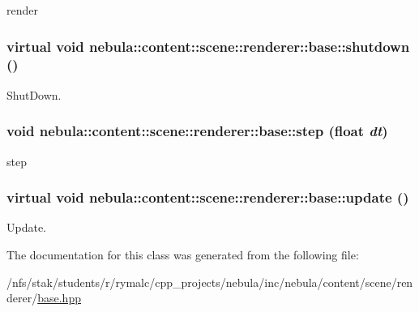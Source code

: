 render \hypertarget{classnebula_1_1content_1_1scene_1_1renderer_1_1base_a62a8f444cb75cfe6ce3d1f49ac37b7bf}{
\subsubsection[{shutdown}]{\setlength{\rightskip}{0pt plus 5cm}virtual void nebula::content::scene::renderer::base::shutdown ()}}
\label{classnebula_1_1content_1_1scene_1_1renderer_1_1base_a62a8f444cb75cfe6ce3d1f49ac37b7bf}


ShutDown. \hypertarget{classnebula_1_1content_1_1scene_1_1renderer_1_1base_ade885ed707f99d8ad18bbb78f6581f0d}{
\subsubsection[{step}]{\setlength{\rightskip}{0pt plus 5cm}void nebula::content::scene::renderer::base::step (float {\em dt})}}
\label{classnebula_1_1content_1_1scene_1_1renderer_1_1base_ade885ed707f99d8ad18bbb78f6581f0d}


step \hypertarget{classnebula_1_1content_1_1scene_1_1renderer_1_1base_abb85502bfd92c766f6ab75fb6582e30b}{
\subsubsection[{update}]{\setlength{\rightskip}{0pt plus 5cm}virtual void nebula::content::scene::renderer::base::update ()}}
\label{classnebula_1_1content_1_1scene_1_1renderer_1_1base_abb85502bfd92c766f6ab75fb6582e30b}


Update. 

The documentation for this class was generated from the following file:\begin{DoxyCompactItemize}
\item 
/nfs/stak/students/r/rymalc/cpp\_\-projects/nebula/inc/nebula/content/scene/renderer/\hyperlink{inc_2nebula_2content_2scene_2renderer_2base_8hpp}{base.hpp}\end{DoxyCompactItemize}
